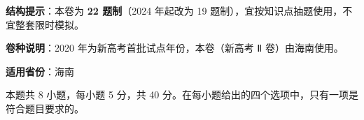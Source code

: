 

\begin{gknotice}
\textbf{结构提示}：本卷为 \textbf{22 题制}（2024 年起改为 19 题制），宜按知识点抽题使用，不宜整套限时模拟。

\textbf{卷种说明}：2020 年为新高考首批试点年份，本卷（新高考 Ⅱ 卷）由海南使用。

\textbf{适用省份}：海南
\end{gknotice}

\par\medskip


\begin{gktip}
本题共 8 小题，每小题 5 分，共 40 分。在每小题给出的四个选项中，只有一项是符合题目要求的。
\end{gktip}


